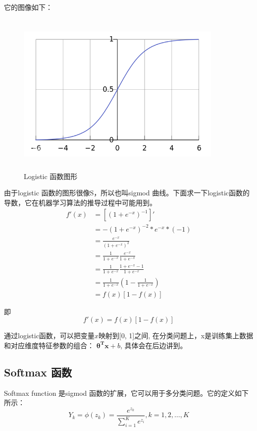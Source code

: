 \documentclass[a4paper,12pt]{book}
\begin{document}
    它的图像如下：
    \begin{figure}[h]
        \begin{center}
            \includegraphics[width=10cm, height=8cm]{7_1.jpg}
            \caption{Logistic 函数图形}
        \end{center}
    \end{figure}
    
    由于logistic 函数的图形很像S，所以也叫sigmod 曲线。下面求一下logistic函数的导数，它在机器学习算法的推导过程中可能用到。
    \begin{equation}
        \begin{aligned}
            f'(x) &= [(1+e^{-x})^{-1}]' \\
            &= -(1+e^{-x})^{-2}*e^{-x}*(-1) \\
            &= \frac{e^{-x}}{(1+e^{-x})^2} \\
            &= \frac{1}{1+e^{-x}} \frac{e^{-x}}{1+e^{-x}} \\
            &= \frac{1}{1+e^{-x}} \frac{1+e^{-x}-1}{1+e^{-x}} \\
            &=\frac{1}{1+e^{-x}} (1- \frac{1}{1+e^{-x}}) \\
            &=f(x)[1-f(x)]
        \end{aligned}
    \end{equation}
    
    
    即 
    \begin{equation}
        f'(x)=f(x)[1-f(x)]
    \end{equation}
    
    通过logistic函数，可以把变量$x$映射到[0, 1]之间,
    在分类问题上，x是训练集上数据和对应维度特征参数的组合：
    $\boldsymbol{\theta ^Tx}+b$, 具体会在后边讲到。
    
    \subsection{Softmax 函数}
    Softmax function 是sigmod 函数的扩展，它可以用于多分类问题。它的定义如下所示：
    \begin{equation}
        Y_k =\phi(z_k)= \frac{e^{z_k}}{\sum_{i=1}^Ke^{z_i}}, k= 1,2, \dots, K
    \end{equation}
\end{document}
